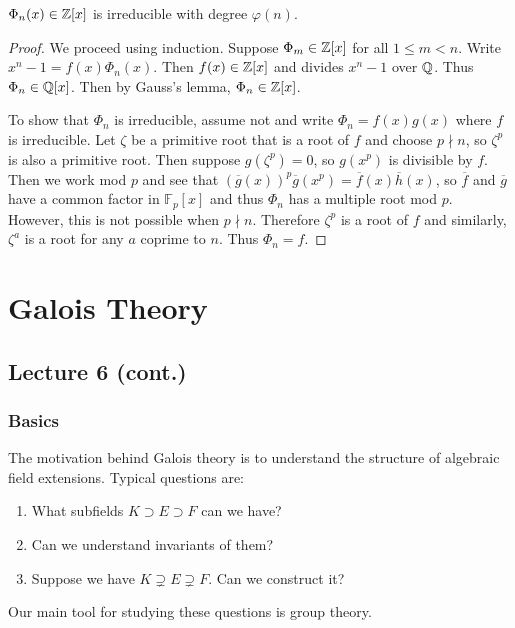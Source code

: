 \documentclass[10pt, twoside]{article}
\newcommand{\F}{\mathbb{F}}
\begin{document}
    \begin{thm}
        $\Phi_n(x) \in \mathbb{Z}[x]$ is irreducible with degree $\varphi(n)$.
        \begin{proof}
            We proceed using induction. Suppose $\Phi_m \in \mathbb{Z}[x]$ for all $1 \leq m < n$. Write $x^n-1 = f(x) \Phi_n(x)$. Then $f(x) \in \mathbb{Z}[x]$ and divides $x^n-1$ over $\mathbb{Q}$. Thus $\Phi_n \in \mathbb{Q}[x]$. Then by Gauss's lemma, $\Phi_n \in \mathbb{Z}[x]$.

            To show that $\Phi_n$ is irreducible, assume not and write $\Phi_n = f(x) g(x)$ where $f$ is irreducible. Let $\zeta$ be a primitive root that is a root of $f$ and choose $p \nmid n$, so $\zeta^p$ is also a primitive root. Then suppose $g(\zeta^p) = 0$, so $g(x^p)$ is divisible by $f$. Then we work mod $p$ and see that $(\overline{g}(x))^p\overline{g}(x^p) = \overline{f}(x)\overline{h}(x)$, so $\overline{f}$ and $\overline{g}$ have a common factor in $\F_p[x]$ and thus $\Phi_n$ has a multiple root mod $p$. However, this is not possible when $p \nmid n$. Therefore $\zeta^p$ is a root of $f$ and similarly, $\zeta^a$ is a root for any $a$ coprime to $n$. Thus $\Phi_n = f$.
        \end{proof}
    \end{thm}

    \section{Galois Theory}

    \subsection{Lecture 6 (cont.)}

    \subsubsection{Basics}
    The motivation behind Galois theory is to understand the structure of algebraic field extensions. Typical questions are:
    \begin{enumerate}
        \item What subfields $K \supset E \supset F$ can we have?
        \item Can we understand invariants of them?
        \item Suppose we have $K \supsetneq E \supsetneq F$. Can we construct it?
    \end{enumerate}

    Our main tool for studying these questions is group theory.
\end{document}
